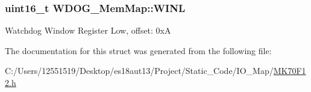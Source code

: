 \subsubsection[{W\+I\+N\+L}]{\setlength{\rightskip}{0pt plus 5cm}uint16\+\_\+t W\+D\+O\+G\+\_\+\+Mem\+Map\+::\+W\+I\+N\+L}\label{struct_w_d_o_g___mem_map_af238938251c1f5904a215c8a4ed1b74d}
Watchdog Window Register Low, offset\+: 0x\+A 

The documentation for this struct was generated from the following file\+:\begin{DoxyCompactItemize}
\item 
C\+:/\+Users/12551519/\+Desktop/es18aut13/\+Project/\+Static\+\_\+\+Code/\+I\+O\+\_\+\+Map/\hyperlink{_m_k70_f12_8h}{M\+K70\+F12.\+h}\end{DoxyCompactItemize}
